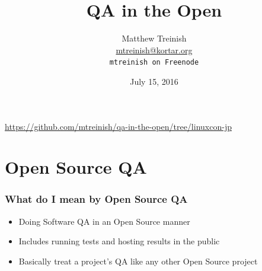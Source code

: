 \documentclass[aspectratio=169,11pt,hyperref={colorlinks=true}]{beamer}
\author[Matthew Treinish]{%
    \texorpdfstring{%
        \centering
        Matthew Treinish\\
        \href{mailto:mtreinish@kortar.org}{mtreinish@kortar.org}\\
        \texttt{mtreinish on Freenode}
   }
   {Matthew Treinish}
}
\date{July 15, 2016}
\title[QA in the Open
\hspace{2em}\insertframenumber/\inserttotalframenumber]{QA in the Open}
\begin{document}
{%
\begin{frame}[noframenumbering]
    \hypersetup{colorlinks,urlcolor=white}
    \titlepage{}
    \centering
    \href{https://github.com/mtreinish/qa-in-the-open/tree/linuxcon-jp}{https://github.com/mtreinish/qa-in-the-open/tree/linuxcon-jp}
\end{frame}
}

\section{Open Source QA}
\begin{frame}
    \frametitle{What do I mean by Open Source QA}
    \begin{itemize}
        \item Doing Software QA in an Open Source manner
        \item Includes running tests and hosting results in the public
        \item Basically treat a project's QA like any other Open Source project
    \end{itemize}
\end{frame}
\end{document}
